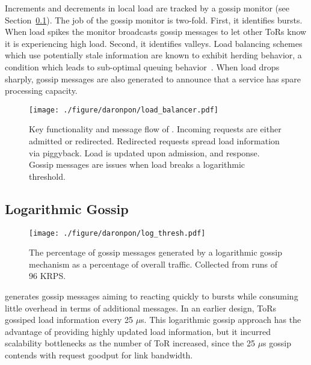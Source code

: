 Increments and decrements in local load are tracked by a gossip monitor (see
Section~\ref{darapon:sec:design:gossip}). The job of the gossip monitor is two-fold. First,
it identifies bursts. When load spikes the monitor broadcasts gossip messages
to let other ToRs know it is experiencing high load. Second, it identifies
valleys. Load balancing schemes which use potentially stale information are
known to exhibit herding behavior, a condition which leads to sub-optimal
queuing behavior~\cite{dahlin_stale_info,mitzenmacher_old_info}. When load
drops sharply, gossip messages are also generated to announce that a service
has spare processing capacity.

\begin{figure}[t]
  \centering
    \texttt{[image: ./figure/daronpon/load\_balancer.pdf]}
    \centering

    \caption{ %
        Key functionality and message flow of \daronpon.
        Incoming requests are either admitted or redirected.
        Redirected requests spread load information via piggyback.
        Load is updated upon admission, and response.  Gossip messages
        are issues when load breaks a logarithmic threshold.}

  \label{fig:load_balancer}
\end{figure}

\subsection{Logarithmic Gossip}
\label{darapon:sec:design:gossip}

\begin{figure}[t]
  \centering
    \texttt{[image: ./figure/daronpon/log\_thresh.pdf]}
    \centering
    \caption{The percentage of gossip messages generated by a
    logarithmic gossip mechanism as a percentage of overall traffic.
    Collected from runs of 96 KRPS.} 
  \label{fig:log_thresh}
\end{figure}

\daronpon generates gossip messages aiming to reacting quickly to bursts while consuming little overhead in terms of additional messages.  
%
In an earlier design, ToRs gossiped load information every 25 $\mu$s. 
%
This logarithmic gossip approach has the advantage of providing highly updated load information, but it incurred scalability bottlenecks as the number of ToR increased, since the 25 $\mu$s gossip contends with request goodput for link bandwidth.

